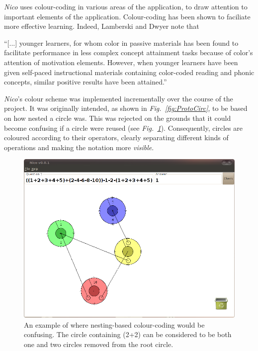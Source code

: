 \documentclass[12pt,twoside,notitlepage,xetex]{report}
\begin{document}
{%
\emph{Nico} uses colour-coding in various areas of the application, to draw attention to important elements of the application.  Colour-coding has been shown to faciliate more effective learning.  Indeed, Lamberski and Dwyer note that
\begin{center}
\parbox[c]{\textwidth-2cm}{
\small
``[...] younger learners, for whom color in passive materials has been found to facilitate performance in less complex concept attainment tasks because of color's attention of motivation elements.  However, when younger learners have been given self-paced instructional materials containing color-coded reading and phonic concepts, similar positive results have been attained.'' \cite{Lamberski1983}
}
\end{center}
\emph{Nico}'s colour scheme was implemented incrementally over the course of the project.  It was originally intended, as shown in \emph{Fig.~\ref{fig:ProtoCirc}}, to be based on how nested a circle was.  This was rejected on the grounds that it could become confusing if a circle were reused (see \emph{Fig.~\ref{fig:Nico2}}).  Consequently, circles are coloured according to their operators, clearly separating different kinds of operations and making the notation more \emph{visible}.

\begin{center}
\begin{figure}[H]
\begin{center}
\includegraphics[width=\textwidth-2cm]{figs/nico_screen_02.png}
\end{center}
\caption{An example of where nesting-based colour-coding would be confusing.  The circle containing (2+2) can be considered to be both one and two circles removed from the root circle.}
\label{fig:Nico2}
\end{figure}
\end{center}

}
\end{document}
